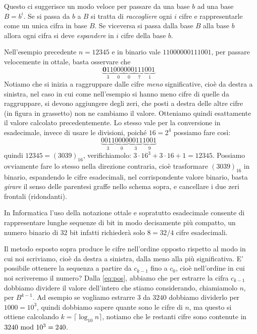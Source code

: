 Questo ci suggerisce un modo veloce per passare da una base $b$ ad una base $B=b^i$. Se si passa da $b$ a $B$ si tratta di \emph{raccogliere} ogni $i$ cifre e rappresentarle come un unica cifra in base $B$. Se viceversa si passa dalla base $B$ alla base $b$ allora ogni cifra si deve \emph{espandere} in $i$
cifre della base $b$.

\begin{ex}
Nell'esempio precedente $n=12345$ e in binario vale $11000000111001$, per passare velocemente in ottale, basta osservare che
\[
\underbrace{\mathbf{0}11}_{3}\underbrace{000}_{0}\underbrace{000}_{0}\underbrace{111}_{7}\underbrace{001}_{1}
\]
\noindent Notiamo che si inizia a raggruppare dalle cifre \emph{meno} significative, cioè da destra a sinistra, nel caso in cui come nell'esempio si hanno meno cifre di quelle da raggruppare, si devono aggiungere degli zeri, che posti a destra delle altre cifre (in figura in grassetto) non ne cambiamo il valore. Otteniamo
quindi esattamente il valore calcolato precedentemente. Lo stesso vale per la conversione in esadecimale, invece di usare le divisioni, poiché $16 = 2^4$ possiamo fare così:
\[
\underbrace{0011}_{3}\underbrace{0000}_{0}\underbrace{0011}_{3}\underbrace{1001}_{9}
\]
quindi $12345 = (3039)_{16}$, verifichiamolo: $3\cdot{16}^3+3\cdot{16}+1 = 12345$. Possiamo ovviamente fare lo stesso nella direzione contraria, cioè trasformare $(3039)_{16}$ in binario, espandendo le cifre esadecimali, nel corrispondente valore binario, basta \emph{girare} il senso delle parentesi graffe nello schema sopra, e cancellare i due zeri frontali (ridondanti).
\end{ex}

In Informatica l'uso della notazione ottale e sopratutto esadecimale consente
di rappresentare lunghe sequenze di bit in modo decisamente più compatto, un
numero binario di $32$ bit infatti richiederà solo $8 = 32/4$ cifre esadecimali.

Il metodo esposto sopra produce le cifre nell'ordine opposto rispetto al modo in cui noi scriviamo,  
cioè da destra a sinistra, dalla meno alla più significativa. E' possibile ottenere la sequenza a partire da $c_{k-1}$ fino
a $c_0$, cioè nell'ordine in cui noi scriveremo il numero? Dalla \eqref{eq:pos},
abbiamo che per estrarre la cifra $c_{k-1}$ dobbiamo dividere il valore dell'intero che stiamo considerando, chiamiamolo $n$, per $B^{k-1}$. Ad esempio
se vogliamo estrarre $3$ da $3240$ dobbiamo dividerlo per $1000 = 10^3$, quindi dobbiamo sapere quante sono le cifre di $n$, ma questo si ottiene calcolando
$k = \lceil \log_{10} n \rceil$, notiamo che le restanti cifre sono contenute in $3240 \ \text{mod}\ 10^3 = 240$.

